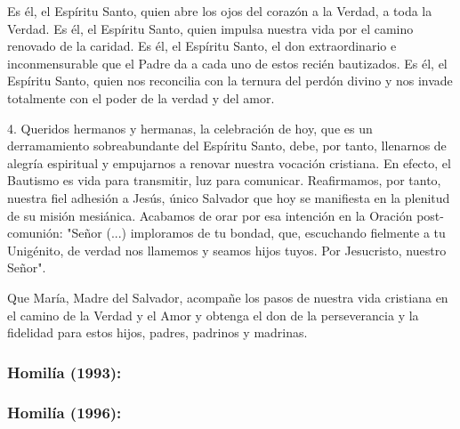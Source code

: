 Es él, el Espíritu Santo, quien abre los ojos del corazón a la Verdad, a
toda la Verdad. Es él, el Espíritu Santo, quien impulsa nuestra vida por
el camino renovado de la caridad. Es él, el Espíritu Santo, el don
extraordinario e inconmensurable que el Padre da a cada uno de estos
recién bautizados. Es él, el Espíritu Santo, quien nos reconcilia con la
ternura del perdón divino y nos invade totalmente con el poder de la
verdad y del amor.

4. Queridos hermanos y hermanas, la celebración de hoy, que es un
derramamiento sobreabundante del Espíritu Santo, debe, por tanto,
llenarnos de alegría espiritual y empujarnos a renovar nuestra vocación
cristiana. En efecto, el Bautismo es vida para transmitir, luz para
comunicar. Reafirmamos, por tanto, nuestra fiel adhesión a Jesús, único
Salvador que hoy se manifiesta en la plenitud de su misión mesiánica.
Acabamos de orar por esa intención en la Oración post-comunión: "Señor
(...) imploramos de tu bondad, que, escuchando fielmente a tu Unigénito,
de verdad nos llamemos y seamos hijos tuyos. Por Jesucristo, nuestro
Señor".

Que María, Madre del Salvador, acompañe los pasos de nuestra vida
cristiana en el camino de la Verdad y el Amor y obtenga el don de la
perseverancia y la fidelidad para estos hijos, padres, padrinos y
madrinas.


\subsubsection{Homilía (1993): }

\subsubsection{Homilía (1996): }




